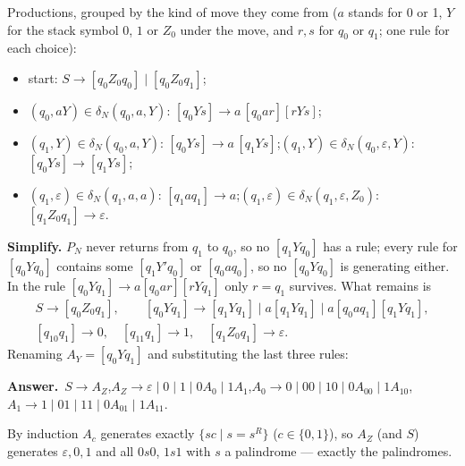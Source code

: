 \documentclass[11pt,a4paper]{article}
\newcommand{\eps}{\varepsilon}
\newcommand{\ans}[1]{\par\smallskip\noindent\colorbox{mist}{\parbox{\dimexpr\linewidth-2\fboxsep}{\sffamily\small\textbf{\color{teal}Answer.}\ \color{ink}#1}}\par}
\begin{document}
\begin{solution}
Productions, grouped by the kind of move they come from ($a$ stands for 0 or 1, $Y$ for the stack symbol $0$, $1$ or $Z_0$ under the move, and $r,s$ for $q_0$ or $q_1$; one rule for each choice):
\begin{itemize}
\item start: $S\to[q_0Z_0q_0]\mid[q_0Z_0q_1]$;
\item $(q_0,aY)\in\delta_N(q_0,a,Y)$: $[q_0Ys]\to a\,[q_0ar][rYs]$;
\item $(q_1,Y)\in\delta_N(q_0,a,Y)$: $[q_0Ys]\to a\,[q_1Ys]$;\quad $(q_1,Y)\in\delta_N(q_0,\eps,Y)$: $[q_0Ys]\to[q_1Ys]$;
\item $(q_1,\eps)\in\delta_N(q_1,a,a)$: $[q_1aq_1]\to a$;\quad $(q_1,\eps)\in\delta_N(q_1,\eps,Z_0)$: $[q_1Z_0q_1]\to\eps$.
\end{itemize}
\textbf{Simplify.} $P_N$ never returns from $q_1$ to $q_0$, so no $[q_1Yq_0]$ has a rule; every rule for $[q_0Yq_0]$ contains some $[q_1Y'q_0]$ or $[q_0aq_0]$, so no $[q_0Yq_0]$ is generating either. In the rule $[q_0Yq_1]\to a[q_0ar][rYq_1]$ only $r=q_1$ survives. What remains is
\[\begin{array}{l}S\to[q_0Z_0q_1],\qquad [q_0Yq_1]\to[q_1Yq_1]\mid a[q_1Yq_1]\mid a[q_0aq_1][q_1Yq_1],\\ {}[q_10q_1]\to0,\quad [q_11q_1]\to1,\quad [q_1Z_0q_1]\to\eps.\end{array}\]
Renaming $A_Y=[q_0Yq_1]$ and substituting the last three rules:
\ans{$S\to A_Z$,\quad $A_Z\to\eps\mid0\mid1\mid0A_0\mid1A_1$,\newline $A_0\to0\mid00\mid10\mid0A_00\mid1A_10$,\quad $A_1\to1\mid01\mid11\mid0A_01\mid1A_11$.}
By induction $A_c$ generates exactly $\{sc\mid s=s^R\}$ ($c\in\{0,1\}$), so $A_Z$ (and $S$) generates $\eps,0,1$ and all $0s0$, $1s1$ with $s$ a palindrome --- exactly the palindromes.
\end{solution}
\end{document}
